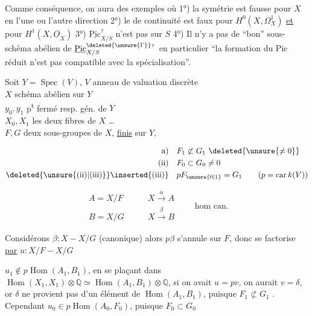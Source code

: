 Comme conséquence, on aura des exemples où 1°) la symétrie est fausse pour $X$ en l'une ou l'autre direction 2°) le  de continuité est faux pour $H^0(X,\Omega^1_X)$ \uline{et} pour $H^1(X,\underline{O}_X)$ 3°) $\underline{\mathrm{Pic}}^\tau_{X/S}$ n'est pas  sur $S$ 4°) Il n'y a pas de ``bon'' sous-schéma abélien de $\underline{\mathrm{Pic}}^{\deleted{\unsure{\Gamma}}\tau}_{X/S}$ en particulier ``la formation du Pic réduit n'est pas compatible avec la spécialisation''.


Soit $Y=\operatorname{Spec}(V)$, $V$ anneau de valuation discrète\\
$X$ schéma abélien sur $Y$\\
$y_0,y_1$ p\textsuperscript{t} fermé resp. gén. de $Y$\\
$X_0,X_1$ les deux fibres de $X$ \ldots\\
$F,G$ deux sous-groupes de $X$, \uline{finis} sur $Y$,

\[
\begin{aligned}
\text{a)}\quad &F_1\not\subset G_1\ \deleted{\unsure{\ne0}}\\
\text{(ii)}\quad &F_0\subset G_0\ne0\\
\text{\deleted{\unsure{(ii)|(iii)}}\inserted{(iii)}}\quad &pF_{\unsure{0|1}}=G_1\qquad(p=\operatorname{car} k(V))
\end{aligned}
\]

\[
\begin{aligned}
A=X/F &\qquad X\xrightarrow{\alpha}A\\
B=X/G &\qquad X\xrightarrow{\beta}B
\end{aligned}
\qquad \text{hom can.}
\]

Considérons $\beta:X\mathbin{-}X/G$ (canonique) alors $p\beta$ s'annule sur  $F$, donc se factorise \uline{par} $u:X/F\mathbin{-}X/G$


 $u_1\notin p\operatorname{Hom}(A_1,B_1)$, en  se plaçant dans $\operatorname{Hom}(X_1,X_1)\otimes\mathbb{Q}\simeq\operatorname{Hom}(A_1,B_1)\otimes\mathbb{Q}$, si on avait $u=pv$, on aurait $v=\delta$, or $\delta$ ne provient pas d'un élément de $\operatorname{Hom}(A_1,B_1)$, puisque $F_1\not\subset G_1$ \deleted{[sinon, par (i), on aurait $F_1=0$ d'où $F=0$, ce qui contredit (ii)]}. Cependant $u_0\in p\operatorname{Hom}(A_0,F_0)$, puisque $F_0\subset G_0$

